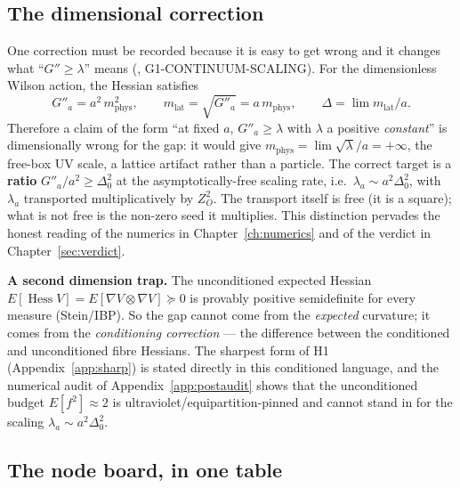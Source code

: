 \figscales

\subsection{The dimensional correction}
\label{sec:dim}

One correction must be recorded because it is easy to get wrong and it changes what
``$G''\ge\lambda$'' means (, G1-CONTINUUM-SCALING). For the
dimensionless Wilson action, the Hessian satisfies
\begin{equation}
G''_a=a^2\,m_{\mathrm{phys}}^2,\qquad
m_{\mathrm{lat}}=\sqrt{G''_a}=a\,m_{\mathrm{phys}},\qquad
\Delta=\lim m_{\mathrm{lat}}/a .
\label{eq:dim}
\end{equation}
Therefore a claim of the form ``at fixed $a$, $G''_a\ge\lambda$ with $\lambda$ a positive
\emph{constant}'' is dimensionally wrong for the gap: it would give
$m_{\mathrm{phys}}=\lim\sqrt{\lambda}/a=+\infty$, the free-box UV scale, a lattice artifact rather
than a particle. The correct target is a \textbf{ratio} $G''_a/a^2\ge\Delta_0^2$ at the
asymptotically-free scaling rate, i.e.\ $\lambda_a\sim a^2\Delta_0^2$, with $\lambda_a$
transported multiplicatively by $Z_O^2$. The transport itself is free (it is a square); what is
not free is the non-zero seed it multiplies. This distinction pervades the honest reading of the
numerics in Chapter~\ref{ch:numerics} and of the verdict in Chapter~\ref{sec:verdict}.

\textbf{A second dimension trap.} The unconditioned expected Hessian
$E[\operatorname{Hess}V]=E[\nabla V\otimes\nabla V]\succeq0$ is provably positive semidefinite for
every measure (Stein/IBP). So the gap cannot come from the \emph{expected} curvature; it comes
from the \emph{conditioning correction} --- the difference between the conditioned and
unconditioned fibre Hessians. The sharpest form of H1 (Appendix~\ref{app:sharp}) is stated
directly in this conditioned language, and the numerical audit of
Appendix~\ref{app:postaudit} shows that the unconditioned budget $E[f^2]\approx2$ is
ultraviolet/equipartition-pinned and cannot stand in for the scaling $\lambda_a\sim a^2\Delta_0^2$.

\subsection{The node board, in one table}

